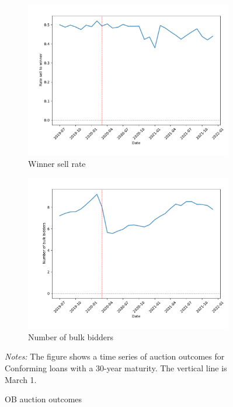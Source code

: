 \documentclass[11pt,a4paper]{article}
\begin{document}
\begin{figure}[h]
\begin{subfigure}[b]{0.49\textwidth}
      \includegraphics[width=0.998\textwidth]{../results/figures/dummy_sell_winner_mean_mat30_loan1_timeseries_nrmonthly_2.5_4_.pdf}
      \caption{ Winner sell rate}
      \end{subfigure}
      \begin{subfigure}[b]{0.49\textwidth}
        \includegraphics[width=0.998\textwidth]{../results/figures/Number of Bulk Bidders_mean_mat30_loan1_timeseries_nrmonthly_2.5_4_.pdf}
        \caption{ Number of bulk bidders}
       \end{subfigure}
     \caption{OB auction outcomes } 
   \begin{minipage}{\textwidth}
      \footnotesize{\textit{Notes:} The figure shows a time series of auction outcomes for Conforming loans with a 30-year maturity. The vertical line is March 1.  } 
      \end{minipage}
\end{figure}
\end{document}
